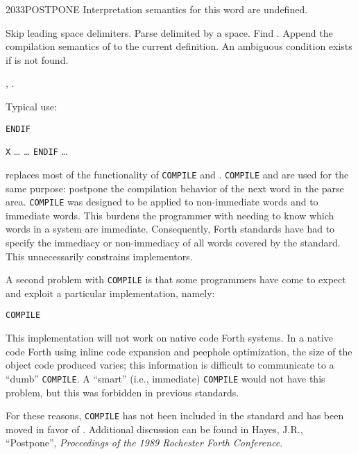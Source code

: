 \begin{worddef}{2033}{POSTPONE}
\interpret
	Interpretation semantics for this word are undefined.

\compile

	Skip leading space delimiters. Parse  delimited by
	a space. Find . Append the compilation semantics of
	 to the current definition. An ambiguous condition
	exists if  is not found.

\see {},
	.

	\begin{rationale} %
		Typical use:

		\tab \word{:} \texttt{ENDIF}
			 
		\word{;} 

		\tab \word{:} \texttt{X} {\ldots}
			 {\ldots} \texttt{ENDIF}
		{\ldots} \word{;}

		 replaces most of the functionality of
		\texttt{COMPILE} and  \word{[COMPILE]}. \texttt{COMPILE} and
	\linebreak
		\word{[COMPILE]} are used for the same purpose: postpone the
		compilation behavior of the next word in the parse area.
		\texttt{COMPILE} was designed to be applied to non-immediate
		words and \word{[COMPILE]} to immediate words. This burdens
		the programmer with needing to know which words in a system
		are immediate. Consequently, Forth standards have had to
		specify the immediacy or non-immediacy of all words covered by
		the standard. This unnecessarily constrains implementors.

		A second problem with \texttt{COMPILE} is that some
		programmers have come to expect and exploit a particular
		implementation, namely:

		\tab \word{:} \texttt{COMPILE} 
			  \word{,}  
		\word{;}

		This implementation will not work on native code Forth systems.
		In a native code Forth using inline code expansion and peephole
		optimization, the size of the object code produced varies; this
		information is difficult to communicate to a ``dumb''
		\texttt{COMPILE}. A ``smart'' (i.e., immediate) \texttt{COMPILE}
		would not have this problem, but this was forbidden in previous
		standards.

		For these reasons, \texttt{COMPILE} has not been included in
		the standard and \word{[COMPILE]} has been moved in favor of
		. Additional discussion can be found in Hayes,
		J.R., ``Postpone'', \emph{Proceedings of the 1989 Rochester
		Forth Conference}.
	\end{rationale}


\end{worddef}
